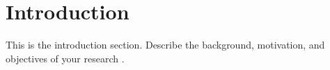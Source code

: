 \section{Introduction}
This is the introduction section. Describe the background, motivation, and objectives of your research \cite{ref1}.


